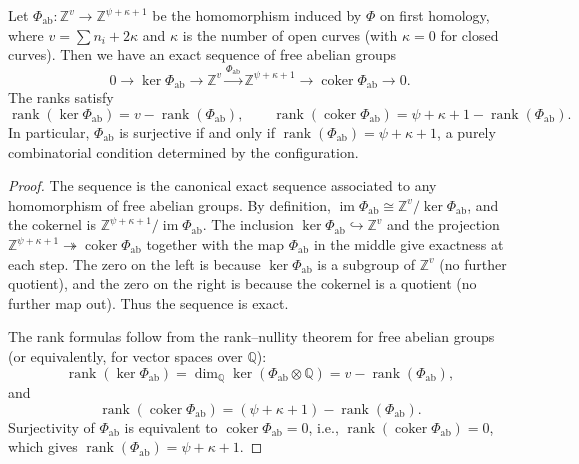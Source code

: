 \documentclass[article,11pt]{amsart} \numberwithin{equation}{section}
\numberwithin{equation}{section}
\begin{document}
{\begin{thm}\label{thm:abelian_exact}
	Let \(\Phi_{\mathrm{ab}} : \mathbb{Z}^v \to \mathbb{Z}^{\psi+\kappa+1}\) be the homomorphism induced by \(\Phi\) on first homology, where \(v = \sum n_i + 2\kappa\) and \(\kappa\) is the number of open curves (with \(\kappa=0\) for closed curves). Then we have an exact sequence of free abelian groups
	\[
	0 \longrightarrow \ker\Phi_{\mathrm{ab}} \longrightarrow \mathbb{Z}^v \xrightarrow{\Phi_{\mathrm{ab}}} \mathbb{Z}^{\psi+\kappa+1} \longrightarrow \operatorname{coker}\Phi_{\mathrm{ab}} \longrightarrow 0.
	\]
	The ranks satisfy
	\[
	\operatorname{rank}(\ker\Phi_{\mathrm{ab}}) = v - \operatorname{rank}(\Phi_{\mathrm{ab}}), \qquad
	\operatorname{rank}(\operatorname{coker}\Phi_{\mathrm{ab}}) = \psi + \kappa + 1 - \operatorname{rank}(\Phi_{\mathrm{ab}}).
	\]
	In particular, \(\Phi_{\mathrm{ab}}\) is surjective if and only if \(\operatorname{rank}(\Phi_{\mathrm{ab}}) = \psi+\kappa+1\), a purely combinatorial condition determined by the configuration.
\end{thm}

\begin{proof}
	The sequence is the canonical exact sequence associated to any homomorphism of free abelian groups. By definition, \(\operatorname{im}\Phi_{\mathrm{ab}} \cong \mathbb{Z}^v / \ker\Phi_{\mathrm{ab}}\), and the cokernel is \(\mathbb{Z}^{\psi+\kappa+1} / \operatorname{im}\Phi_{\mathrm{ab}}\). The inclusion \(\ker\Phi_{\mathrm{ab}} \hookrightarrow \mathbb{Z}^v\) and the projection \(\mathbb{Z}^{\psi+\kappa+1} \twoheadrightarrow \operatorname{coker}\Phi_{\mathrm{ab}}\) together with the map \(\Phi_{\mathrm{ab}}\) in the middle give exactness at each step. The zero on the left is because \(\ker\Phi_{\mathrm{ab}}\) is a subgroup of \(\mathbb{Z}^v\) (no further quotient), and the zero on the right is because the cokernel is a quotient (no further map out). Thus the sequence is exact.
	
	The rank formulas follow from the rank–nullity theorem for free abelian groups (or equivalently, for vector spaces over \(\mathbb{Q}\)):  
	\[
	\operatorname{rank}(\ker\Phi_{\mathrm{ab}}) = \dim_{\mathbb{Q}} \ker(\Phi_{\mathrm{ab}}\otimes\mathbb{Q}) = v - \operatorname{rank}(\Phi_{\mathrm{ab}}),
	\]
	and  
	\[
	\operatorname{rank}(\operatorname{coker}\Phi_{\mathrm{ab}}) = (\psi+\kappa+1) - \operatorname{rank}(\Phi_{\mathrm{ab}}).
	\]
	Surjectivity of \(\Phi_{\mathrm{ab}}\) is equivalent to \(\operatorname{coker}\Phi_{\mathrm{ab}}=0\), i.e., \(\operatorname{rank}(\operatorname{coker}\Phi_{\mathrm{ab}})=0\), which gives \(\operatorname{rank}(\Phi_{\mathrm{ab}}) = \psi+\kappa+1\).
\end{proof}

}
\end{document}
